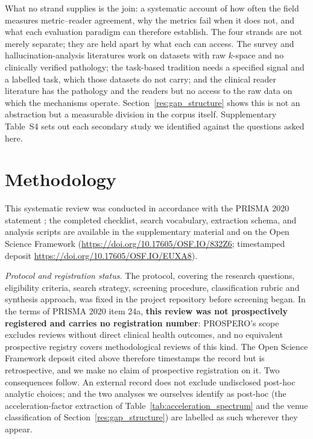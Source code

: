 \documentclass[review,authoryear]{elsarticle}
\begin{document}
What no strand supplies is the join: a systematic account of how often the field measures
metric--reader agreement, why the metrics fail when it does not, and what each evaluation
paradigm can therefore establish. The four strands are not merely separate; they are held
apart by what each can access. The survey and hallucination-analysis literatures work on
datasets with raw $k$-space and no clinically verified pathology; the task-based tradition
needs a specified signal and a labelled task, which those datasets do not carry; and the
clinical reader literature has the pathology and the readers but no access to the raw data
on which the mechanisms operate. Section~\ref{res:gap_structure} shows this is not an
abstraction but a measurable division in the corpus itself. Supplementary Table~S4 sets out
each secondary study we identified against the questions asked here.

\section{Methodology}
\label{sec:methods}

This systematic review was conducted in accordance with the PRISMA 2020 statement
\citep{prisma2020}; the completed checklist, search vocabulary, extraction schema, and
analysis scripts are available in the supplementary material and on the Open Science
Framework (\url{https://doi.org/10.17605/OSF.IO/832Z6}; timestamped deposit \url{https://doi.org/10.17605/OSF.IO/EUXA8}).

\emph{Protocol and registration status.} The protocol, covering the research questions,
eligibility criteria, search strategy, screening procedure, classification rubric and
synthesis approach, was fixed in the project repository before screening began. In the
terms of PRISMA 2020 item 24a, \textbf{this review was not prospectively registered and
carries no registration number}: PROSPERO's scope excludes reviews without direct clinical
health outcomes, and no equivalent prospective registry covers methodological reviews of
this kind. The Open Science Framework deposit cited above therefore timestamps the record
but is retrospective, and we make no claim of prospective registration on it. Two
consequences follow. An external record does not exclude undisclosed post-hoc analytic
choices; and the two analyses we ourselves identify as post-hoc (the acceleration-factor
extraction of Table~\ref{tab:acceleration_spectrum} and the venue classification of
Section~\ref{res:gap_structure}) are labelled as such wherever they appear.
\end{document}
